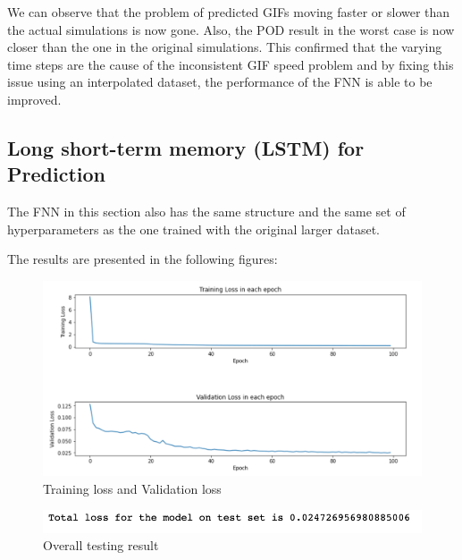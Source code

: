 We can observe that the problem of predicted GIFs moving faster or slower than the actual simulations is now gone. Also, the POD result in the worst case is now closer than the one in the  original simulations. This confirmed that the varying time steps are the cause of the inconsistent GIF speed problem and by fixing this issue using an interpolated dataset, the performance of the FNN is able to be improved.


\subsection{Long short-term memory (LSTM) for Prediction}

The FNN in this section also has the same structure and the same set of hyperparameters as the one trained with the original larger dataset.

The results are presented in the following figures:

\begin{figure}[H]
    \caption{Training loss and Validation loss}
    \includegraphics[scale=0.6]{figures/mantle_convection_images/larger_dataset_interpolated/LSTM_trainingData.png}
\end{figure}

\begin{figure}[H]
    \caption{Overall testing result}
    \includegraphics[scale=0.8]{figures/mantle_convection_images/larger_dataset_interpolated/LSTM_OverallTesting.png}
\end{figure}


